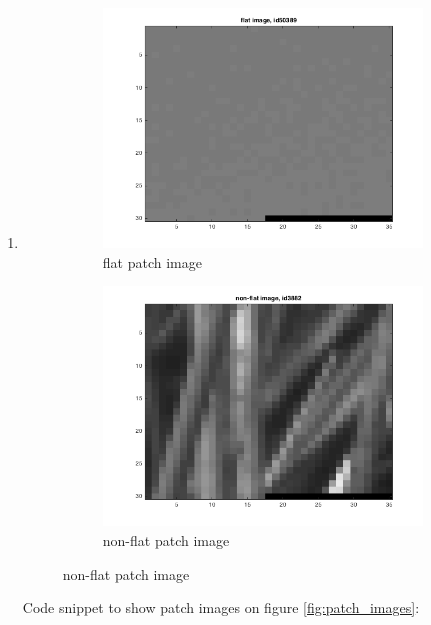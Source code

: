 \documentclass{article}
\begin{document}
\begin{enumerate}[label=(\alph*)]
				\item
				 	\begin{figure}[htbp]
				 		\centering
				 		\caption{patch images}
				 		\label{fig:patch_images}
						\begin{subfigure}{0.5\textwidth}
											      	\includegraphics[width=\linewidth]{images/p1-1-c_flat}
											      	\caption{flat patch image}
											      	\label{fig:flat_patch_image}
						\end{subfigure}%
						\begin{subfigure}{0.5\textwidth}
											      	\includegraphics[width=\linewidth]{images/p1-1-c_non_flat}
											      	\caption{non-flat patch image}
											      	\label{fig:non-flat_patch_image}
						\end{subfigure}%
				 	\end{figure}
					 Code snippet to show patch images on figure \ref{fig:patch_images}:
				 	  
			\end{enumerate}		
\end{document}
